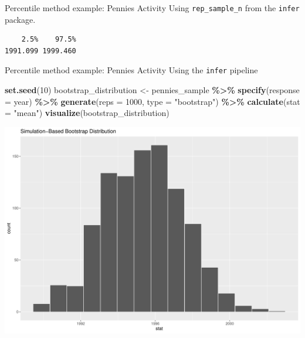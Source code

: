 \documentclass[
  ignorenonframetext,
]{beamer}
\newenvironment{Shaded}{\begin{snugshade}}{\end{snugshade}}
\newcommand{\AttributeTok}[1]{\textcolor[rgb]{0.13,0.29,0.53}{#1}}
\newcommand{\DecValTok}[1]{\textcolor[rgb]{0.00,0.00,0.81}{#1}}
\newcommand{\FloatTok}[1]{\textcolor[rgb]{0.00,0.00,0.81}{#1}}
\newcommand{\FunctionTok}[1]{\textcolor[rgb]{0.13,0.29,0.53}{\textbf{#1}}}
\newcommand{\NormalTok}[1]{#1}
\newcommand{\OtherTok}[1]{\textcolor[rgb]{0.56,0.35,0.01}{#1}}
\newcommand{\SpecialCharTok}[1]{\textcolor[rgb]{0.81,0.36,0.00}{\textbf{#1}}}
\newcommand{\StringTok}[1]{\textcolor[rgb]{0.31,0.60,0.02}{#1}}
\begin{document}
\begin{frame}[fragile]{Percentile method example: Pennies Activity}
\protect\hypertarget{percentile-method-example-pennies-activity-1}{}
Using \texttt{rep\_sample\_n} from the \texttt{infer} package.

\begin{Shaded}
\end{Shaded}

\begin{verbatim}
    2.5%    97.5% 
1991.099 1999.460 
\end{verbatim}
\end{frame}

\begin{frame}[fragile]{Percentile method example: Pennies Activity}
\protect\hypertarget{percentile-method-example-pennies-activity-2}{}
Using the \texttt{infer} pipeline

\tiny

\begin{Shaded}
\begin{Highlighting}[]
\FunctionTok{set.seed}\NormalTok{(}\DecValTok{10}\NormalTok{)}
\NormalTok{bootstrap\_distribution }\OtherTok{\textless{}{-}}\NormalTok{ pennies\_sample }\SpecialCharTok{\%\textgreater{}\%} 
  \FunctionTok{specify}\NormalTok{(}\AttributeTok{response =}\NormalTok{ year) }\SpecialCharTok{\%\textgreater{}\%} 
  \FunctionTok{generate}\NormalTok{(}\AttributeTok{reps =} \DecValTok{1000}\NormalTok{, }\AttributeTok{type =} \StringTok{"bootstrap"}\NormalTok{) }\SpecialCharTok{\%\textgreater{}\%} 
  \FunctionTok{calculate}\NormalTok{(}\AttributeTok{stat =} \StringTok{"mean"}\NormalTok{)}
\FunctionTok{visualize}\NormalTok{(bootstrap\_distribution)}
\end{Highlighting}
\end{Shaded}

\begin{center}\includegraphics[width=0.7\linewidth,height=0.5\textheight]{Week10_Lect_files/figure-beamer/unnamed-chunk-16-1} \end{center}
\normalsize
\end{frame}
\end{document}
